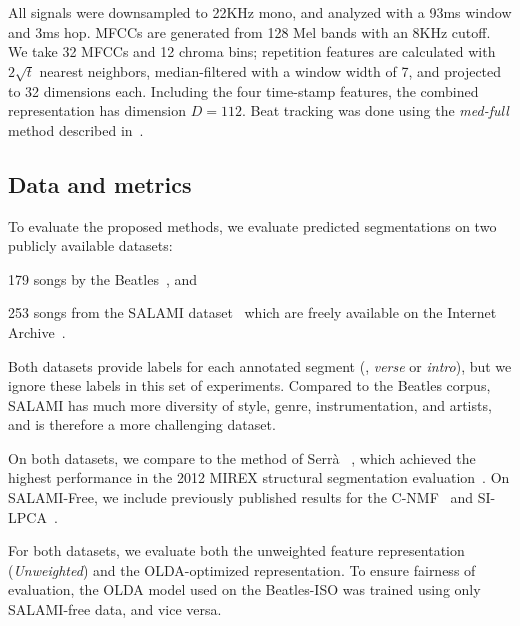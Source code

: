 \documentclass{article}
\begin{document}
All signals were downsampled to 22KHz mono, and analyzed with a 93ms window and 3ms hop.  MFCCs are generated from 128 Mel bands
with an 8KHz cutoff. We take 32 MFCCs and 12 chroma bins; repetition features are calculated with $2\sqrt{t}$ nearest neighbors,
median-filtered with a window width of 7, and projected to 32 dimensions each.  Including the four time-stamp features, the combined
representation has dimension $D=112$. Beat tracking was done using the \emph{med-full} method described in~\cite{mcfee2014beat}.

\subsection{Data and metrics}
To evaluate the proposed methods, we evaluate predicted segmentations on two publicly available datasets:
\begin{description}\addtolength{\itemsep}{-0.25\baselineskip}%
\item[Beatles-ISO] 179 songs by the Beatles~\cite{harte2010towards,isophonicsbeatles}, and
\item[SALAMI-free] 253 songs from the SALAMI dataset~\cite{smith2011design} which are freely available on the 
Internet Archive~\cite{nieto2013convex}.
\end{description}
Both datasets provide labels for each annotated segment (\eg, \emph{verse} or \emph{intro}), but we ignore these
labels in this set of experiments. Compared to the Beatles corpus, SALAMI has much more diversity of style, genre, 
instrumentation, and artists, and is therefore a more challenging dataset.

On both datasets, we compare to the method of Serr\`{a} \etal~\cite{serra2012unsupervised}, which achieved the
highest performance in the 2012 MIREX structural segmentation evaluation~\cite{Downie2008}.
On SALAMI-Free, we include previously published results for the C-NMF~\cite{nieto2013convex} and SI-LPCA~\cite{weiss2011unsupervised}.

For both datasets, we evaluate both the unweighted feature representation (\emph{Unweighted}) and the OLDA-optimized
representation. To ensure fairness of evaluation, the OLDA model used on the Beatles-ISO was trained using only
SALAMI-free data, and vice versa.
\end{document}
